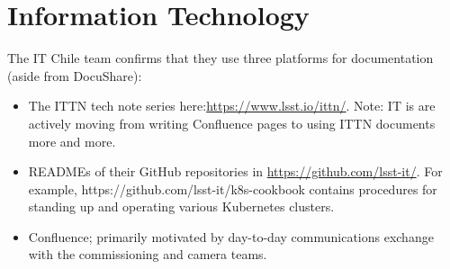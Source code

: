 \newpage
\section{Information Technology}

The IT Chile team confirms that they use three platforms for documentation (aside from DocuShare):

\begin{itemize}

	\item The ITTN tech note series here:\url{https://www.lsst.io/ittn/}. Note:  IT is are actively moving from writing Confluence pages to using ITTN documents more and more.
	\item READMEs of their GitHub repositories in \url{https://github.com/lsst-it/}. For example, https://github.com/lsst-it/k8s-cookbook contains procedures for standing up and operating various Kubernetes clusters.
	\item Confluence; primarily motivated by day-to-day communications exchange with the commissioning and camera teams.
	
\end{itemize}
